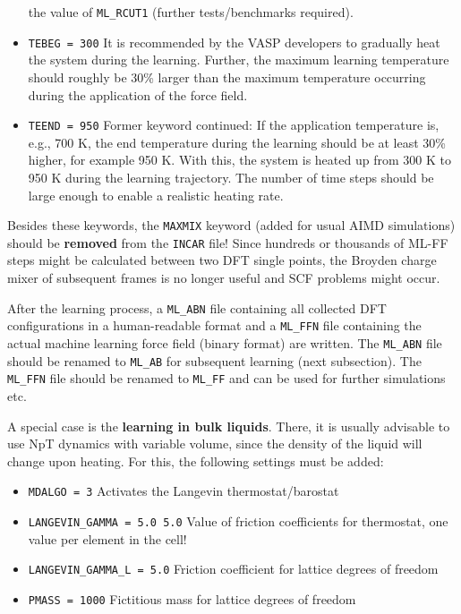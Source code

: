 \documentclass[a4paper,11pt]{article}
\begin{document}
\begin{itemize}
   the value of \texttt{ML\_RCUT1} (further tests/benchmarks required).
 \item \texttt{TEBEG = 300} It is recommended by the VASP developers to gradually heat the system during the learning.
   Further, the maximum learning temperature should roughly be 30\% larger than the maximum temperature occurring during 
   the application of the force field.  
 \item \texttt{TEEND = 950} Former keyword continued: If the application temperature is, e.g., 700 K, the end temperature
   during the learning should be at least 30\% higher, for example 950 K. With this, the system is heated up from 
   300 K to 950 K during the learning trajectory. The number of time steps should be large enough to enable a 
   realistic heating rate.
\end{itemize}

Besides these keywords, the \texttt{MAXMIX} keyword (added for usual AIMD simulations) should be \textbf{removed}
from the \texttt{INCAR} file! Since hundreds or thousands of ML-FF steps might be calculated between two DFT single points,
the Broyden charge mixer of subsequent frames is no longer useful and SCF problems might occur.

After the learning process, a \texttt{ML\_ABN} file containing all collected DFT configurations in a human-readable 
format and a \texttt{ML\_FFN} file containing the actual machine learning force field (binary format) are written.
The \texttt{ML\_ABN} file should be renamed to \texttt{ML\_AB} for subsequent learning (next subsection).
The \texttt{ML\_FFN} file should be renamed to \texttt{ML\_FF} and can be used for further simulations etc.

A special case is the \textbf{learning in bulk liquids}. There, it is usually advisable to use NpT dynamics with variable volume,
since the density of the liquid will change upon heating. 
For this, the following settings must be added:

\begin{itemize}
 \item \texttt{MDALGO = 3} Activates the Langevin thermostat/barostat
 \item \texttt{LANGEVIN\_GAMMA = 5.0 5.0} Value of friction coefficients for thermostat, one value per element in the cell!
 \item \texttt{LANGEVIN\_GAMMA\_L = 5.0} Friction coefficient for lattice degrees of freedom 
 \item \texttt{PMASS = 1000} Fictitious mass for lattice degrees of freedom
\end{itemize}
\end{document}
